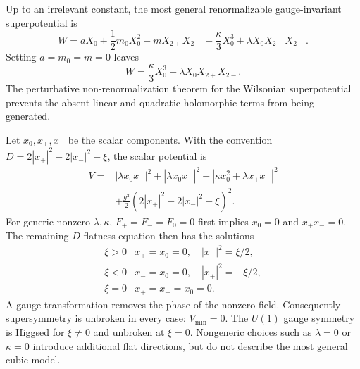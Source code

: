 \begin{enumerate}
\begin{enumerate}
      Up to an irrelevant constant, the most general renormalizable
      gauge-invariant superpotential is
      \[
        W=aX_0+\frac12m_0X_0^2+mX_{2+}X_{2-}
          +\frac{\kappa}{3}X_0^3
          +\lambda X_0X_{2+}X_{2-}.
      \]
      Setting \(a=m_0=m=0\) leaves
      \[
        W=\frac{\kappa}{3}X_0^3+\lambda X_0X_{2+}X_{2-}.
      \]
      The perturbative non-renormalization theorem for the Wilsonian
      superpotential prevents the absent linear and quadratic holomorphic
      terms from being generated.

      Let \(x_0,x_+,x_-\) be the scalar components.  With the convention
      \(D=2|x_+|^2-2|x_-|^2+\xi\), the scalar potential is
      \[
      \begin{aligned}
        V={}&|\lambda x_0x_-|^2+|\lambda x_0x_+|^2
          +|\kappa x_0^2+\lambda x_+x_-|^2\\
          &+\frac{g^2}{2}
            \left(2|x_+|^2-2|x_-|^2+\xi\right)^2.
      \end{aligned}
      \]
      For generic nonzero \(\lambda,\kappa\), \(F_+=F_-=F_0=0\) first
      implies \(x_0=0\) and \(x_+x_-=0\).  The remaining \(D\)-flatness
      equation then has the solutions
      \[
      \begin{array}{c|c}
        \xi>0 & x_+=x_0=0,\quad |x_-|^2=\xi/2,\\[2pt]
        \xi<0 & x_-=x_0=0,\quad |x_+|^2=-\xi/2,\\[2pt]
        \xi=0 & x_+=x_-=x_0=0.
      \end{array}
      \]
      A gauge transformation removes the phase of the nonzero field.
      Consequently supersymmetry is unbroken in every case:
      \(V_{\min}=0\).  The \(U(1)\) gauge symmetry is Higgsed for
      \(\xi\ne0\) and unbroken at \(\xi=0\).  Nongeneric choices such as
      \(\lambda=0\) or \(\kappa=0\) introduce additional flat directions,
      but do not describe the most general cubic model.
  \end{enumerate}


\end{enumerate}
